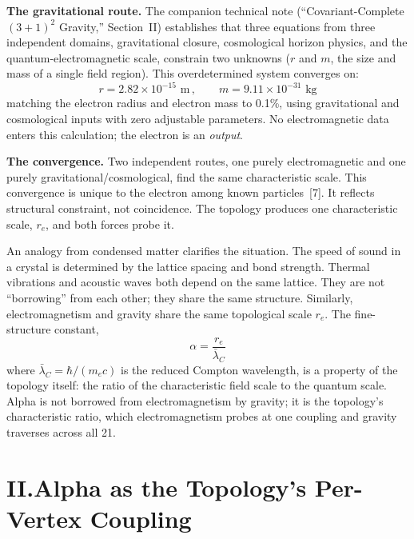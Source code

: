 \documentclass[11pt]{article}
\begin{document}
\textbf{The gravitational route.}\quad
The companion technical note (``Covariant-Complete $(3+1)^2$ Gravity,'' Section~II) establishes that three equations from three independent domains, gravitational closure, cosmological horizon physics, and the quantum-electromagnetic scale, constrain two unknowns ($r$ and $m$, the size and mass of a single field region).
This overdetermined system converges on:
\begin{equation*}
r = 2.82 \times 10^{-15}\text{ m}\,,\qquad m = 9.11 \times 10^{-31}\text{ kg}
\end{equation*}
matching the electron radius and electron mass to 0.1\%, using gravitational and cosmological inputs with zero adjustable parameters.
No electromagnetic data enters this calculation; the electron is an \emph{output}.

\textbf{The convergence.}\quad
Two independent routes, one purely electromagnetic and one purely gravitational/cosmological, find the same characteristic scale.
This convergence is unique to the electron among known particles~[7].
It reflects structural constraint, not coincidence.
The topology produces one characteristic scale, $r_e$, and both forces probe it.

An analogy from condensed matter clarifies the situation.
The speed of sound in a crystal is determined by the lattice spacing and bond strength.
Thermal vibrations and acoustic waves both depend on the same lattice.
They are not ``borrowing'' from each other; they share the same structure.
Similarly, electromagnetism and gravity share the same topological scale $r_e$.
The fine-structure constant,
\begin{equation}
\alpha = \frac{r_e}{\bar{\lambda}_C}
\label{eq:alpha-ratio-scales}
\end{equation}
where $\bar{\lambda}_C = \hbar/(m_e c)$ is the reduced Compton wavelength, is a property of the topology itself: the ratio of the characteristic field scale to the quantum scale.
Alpha is not borrowed from electromagnetism by gravity; it is the topology's characteristic ratio, which electromagnetism probes at one coupling and gravity traverses across all 21.

\section*{II.\quad Alpha as the Topology's Per-Vertex Coupling}
\end{document}
